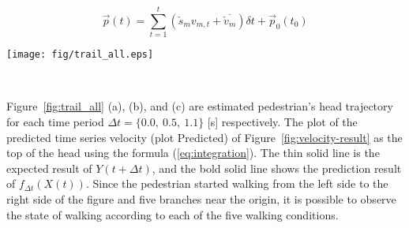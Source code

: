 \documentclass{sigchi}
\begin{document}
\begin{equation}
\vec{p}(t) = \sum^{t}_{t=1}(\check{s}_m  v_{m,t} +  \overline{\check{v}_{m}})  \delta t+ \vec{p}_0(t_0)
\label{eq:integration}
\end{equation}

\begin{figure*}
\centering
  \texttt{[image: fig/trail\_all.eps]}
  \caption{Gait trajectory estimated with the predicted velocity of participant's top head. Figure (a)-(c) are obtained with Deep Brief Net (DBN) model shown in Figure~\ref{fig:dbn}. Figure (d) and (e) are obtained with \textit{time shift} data structure as well as extended DBN model shown in Figure~\ref{fig:dbn_timeshift}.}
  ~\label{fig:trail_all}
\end{figure*}



Figure~\ref{fig:trail_all} (a), (b), and (c) are estimated pedestrian's head trajectory for each time period $ \Delta t = \{0.0, \ 0.5, \ 1.1 \} $ [s] respectively. The plot of the predicted time series velocity (plot Predicted) of Figure~\ref{fig:velocity-result} as the top of the head using the formula (\ref {eq:integration}). The thin solid line is the expected result of $ Y (t + \Delta t) $, and the bold solid line shows the prediction result of $ f_ {\Delta t} (X (t)) $. Since the pedestrian started walking from the left side to the right side of the figure and five branches near the origin, it is possible to observe the state of walking according to each of the five walking conditions.

\end{document}
